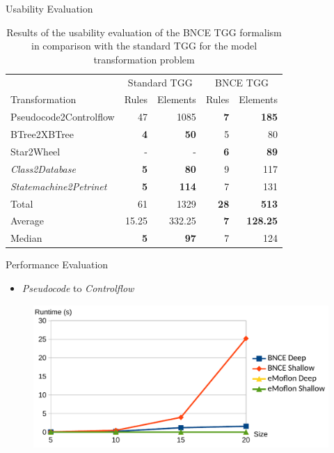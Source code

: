 \documentclass[usenames,dvipsnames]{beamer}
\begin{document}
	\begin{frame}{Usability Evaluation}
		\footnotesize 
		\begin{table}[h]
			\centering
			\begin{tabular}{l r r r r }
				\hline
				& \multicolumn{2}{c}{Standard TGG} & \multicolumn{2}{c}{BNCE TGG}\\
				Transformation 			& Rules & Elements 	& Rules & Elements\\
				\hline
				Pseudocode2Controlflow	& 47			& 1085	& \textbf{7}	& \textbf{185} \\
				BTree2XBTree			& \textbf{4}	& \textbf{50}	& 5		& 80 \\
				Star2Wheel				& -				& -		& \textbf{6}	& \textbf{89} \\
				\emph{Class2Database}	& \textbf{5}	& \textbf{80}	& 9 	& 117 \\
				\emph{Statemachine2Petrinet}& \textbf{5}& \textbf{114}	& 7		& 131 \\
				\hline
				Total					& 61 			& 1329	& \textbf{28}	& \textbf{513} \\
				Average					& 15.25 		& 332.25& \textbf{7}	& \textbf{128.25}\\
				Median					& \textbf{5}	& \textbf{97}	& 7		& 124 \\
				\hline
			\end{tabular}
			\caption{Results of the usability evaluation of the BNCE TGG formalism in comparison with the standard TGG for the model transformation problem}
		\end{table}
	\end{frame}
	
	\begin{frame}{Performance Evaluation}
		\begin{itemize}
			\item \emph{Pseudocode} to \emph{Controlflow}
		\end{itemize}
		\begin{figure}
			\centering
			\includegraphics[width=\textwidth]{figures/performance/pseudocode2controlflow}
		\end{figure}
	\end{frame}
	
\end{document}
